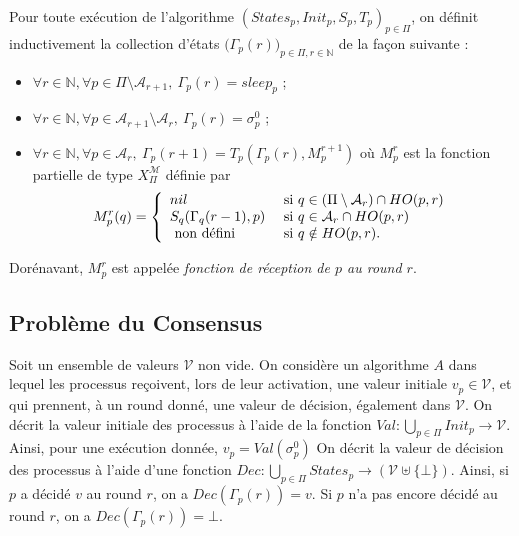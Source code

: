\documentclass{article}
\begin{document}
Pour toute  exécution de l'algorithme  $(States_p, Init_p, S_p,T_p)_{p\in \Pi}$, on définit inductivement la collection 
	d'\'etats $ \big( \Gamma_p(r) \big )_{p\in\Pi, r\in \mathds{N}}$ de la fa\c{c}on suivante : 
	\begin{itemize}
		\item $\forall r \in \mathds{N},\forall p \in \Pi \setminus \mathcal{A}_{r+1}, \  \Gamma_p(r) = sleep_p$ ;
		\item $\forall r  \in \mathds{N},\forall p \in \mathcal{A}_{r+1} \setminus \mathcal{A}_r, \ \Gamma_p(r) = \sigma^0_p$ ;
		\item $\forall r  \in \mathds{N},\forall p \in \mathcal{A}_{r} , \  \Gamma_p(r+1) = T_p (\Gamma_p(r) ,M_p^{r+1})$
			où $M_p^r$ est la fonction partielle de type $X_\Pi^\mathcal{M}$ définie par 
			$$ M_p^r(q) = \left \{ \begin{array}{l l}
	                         nil  & \mbox{ si  } q \in (\Pi \setminus \mathcal{A}_r  ) \cap  HO(p,r)  \\
	                         S_q (\Gamma_q(r-1), p)  & \mbox{ si  }   q \in \mathcal{A}_r  \cap  HO(p,r) \\
	                         \mbox{ non d\'efini  } & \mbox{ si  }   q \notin  HO(p,r) .
	                          \end{array} \right.$$ 
	\end{itemize}
Dorénavant, $M_p^r$ est appelée \emph{fonction de réception de $p$ au round $r$}.

\subsection{Problème du Consensus}

	Soit un ensemble de valeurs $\mathcal{V}$ non vide.
	On considère un algorithme $A$ dans lequel les processus reçoivent, lors de leur activation, une valeur initiale $v_p \in \mathcal{V}$,
	et qui prennent, à un round donné, une valeur de décision, également dans $\mathcal{V}$.
	On décrit la valeur initiale des processus à l'aide de la fonction $Val : \bigcup\limits_{p \in \Pi} Init_p  \rightarrow \mathcal{V}$.
	Ainsi, pour une exécution donnée, $v_p = Val(\sigma_p^0)$
	On décrit la valeur de décision des processus à l'aide d'une fonction
	$Dec : \bigcup\limits_{p \in \Pi} States_p  \rightarrow (\mathcal{V} \uplus \{\bot\})$.
	Ainsi, si $p$ a décidé $v$ au round $r$, on a $Dec(\Gamma_p(r)) = v$. Si $p$ n'a pas encore décidé au round $r$, on a $Dec(\Gamma_p(r)) = \bot$.
\end{document}
